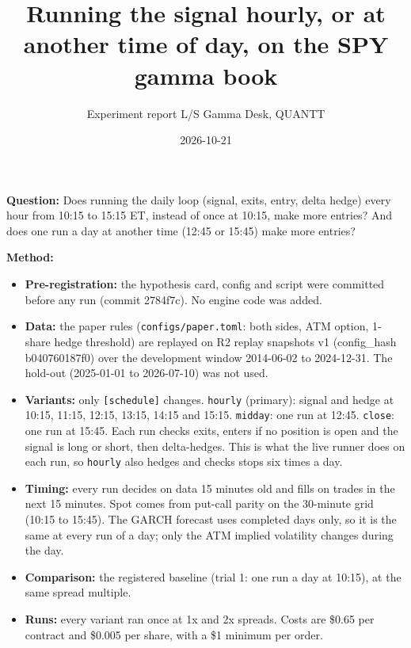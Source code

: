 \documentclass{article}
\title{Running the signal hourly, or at another time of day, on the SPY gamma book}
\author{Experiment report \textperiodcentered{} L/S Gamma Desk, QUANTT}
\date{2026-10-21}
\begin{document}
\maketitle

\textbf{Question:} Does running the daily loop (signal, exits, entry, delta hedge) every hour from 10:15 to 15:15 ET, instead of once at 10:15, make more entries? And does one run a day at another time (12:45 or 15:45) make more entries?

\textbf{Method:}

\begin{itemize}

\item \textbf{Pre-registration:} the hypothesis card, config and script were committed before any run (commit 2784f7c). No engine code was added.

\item \textbf{Data:} the paper rules (\texttt{configs/\allowbreak{}paper.\allowbreak{}toml}: both sides, ATM option, 1-share hedge threshold) are replayed on R2 replay snapshots v1 (config\_hash b040760187f0) over the development window 2014-06-02 to 2024-12-31. The hold-out (2025-01-01 to 2026-07-10) was not used.

\item \textbf{Variants:} only \texttt{[schedule]} changes. \texttt{hourly} (primary): signal and hedge at 10:15, 11:15, 12:15, 13:15, 14:15 and 15:15. \texttt{midday}: one run at 12:45. \texttt{close}: one run at 15:45. Each run checks exits, enters if no position is open and the signal is long or short, then delta-hedges. This is what the live runner does on each run, so \texttt{hourly} also hedges and checks stops six times a day.

\item \textbf{Timing:} every run decides on data 15 minutes old and fills on trades in the next 15 minutes. Spot comes from put-call parity on the 30-minute grid (10:15 to 15:45). The GARCH forecast uses completed days only, so it is the same at every run of a day; only the ATM implied volatility changes during the day.

\item \textbf{Comparison:} the registered baseline (trial 1: one run a day at 10:15), at the same spread multiple.

\item \textbf{Runs:} every variant ran once at 1x and 2x spreads. Costs are \$0.65 per contract and \$0.005 per share, with a \$1 minimum per order.

\end{itemize}
\end{document}
